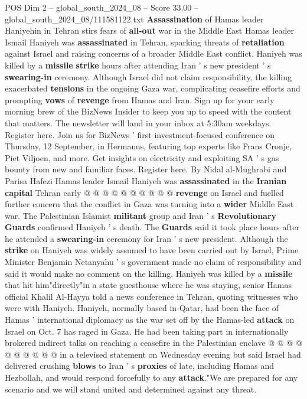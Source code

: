 \begin{textsample}{POS Dim 2 – global\_south\_2024\_08 – Score 33.00 – global\_south\_2024\_08/111581122.txt}  \label{ex:f2_pos_004}
\textbf{Assassination} of Hamas leader Haniyehin in Tehran stirs fears of \textbf{all-out} war in the Middle East Hamas leader Ismail Haniyeh was \textbf{assassinated} in Tehran, sparking threats of \textbf{retaliation} against Israel and raising concerns of a broader Middle East conflict.
Haniyeh was killed by a \textbf{missile} \textbf{strike} hours after attending Iran ' s new president ' s \textbf{swearing-in} ceremony.
Although Israel did not claim responsibility, the killing exacerbated \textbf{tensions} in the ongoing Gaza war, complicating ceasefire efforts and prompting \textbf{vows} of \textbf{revenge} from Hamas and Iran.
Sign up for your early morning brew of the BizNews Insider to keep you up to speed with the content that matters.
The newsletter will land in your inbox at 5:30am weekdays.
Register here.
Join us for BizNews ' first investment-focused conference on Thursday, 12 September, in Hermanus, featuring top experts like Frans Cronje, Piet Viljoen, and more.
Get insights on electricity and exploiting SA ' s gas bounty from new and familiar faces.
Register here.
By Nidal al-Mughrabi and Parisa Hafezi Hamas leader Ismail Haniyeh was \textbf{assassinated} in the \textbf{Iranian} \textbf{capital} Tehran early @ @ @ @ @ @ @ @ @ @ \textbf{revenge} on Israel and fuelled further concern that the conflict in Gaza was turning into a \textbf{wider} Middle East war.
The Palestinian Islamist \textbf{militant} group and Iran ' s \textbf{Revolutionary} \textbf{Guards} confirmed Haniyeh ' s death.
The \textbf{Guards} said it took place hours after he attended a \textbf{swearing-in} ceremony for Iran ' s new president.
Although the \textbf{strike} on Haniyeh was widely assumed to have been carried out by Israel, Prime Minister Benjamin Netanyahu ' s government made no claim of responsibility and said it would make no comment on the killing.
Haniyeh was killed by a \textbf{missile} that hit him"directly"in a state guesthouse where he was staying, senior Hamas official Khalil Al-Hayya told a news conference in Tehran, quoting witnesses who were with Haniyeh.
Haniyeh, normally based in Qatar, had been the face of Hamas ' international diplomacy as the war set off by the Hamas-led \textbf{attack} on Israel on Oct. 7 has raged in Gaza.
He had been taking part in internationally brokered indirect talks on reaching a ceasefire in the Palestinian enclave @ @ @ @ @ @ @ @ @ @ in a televised statement on Wednesday evening but said Israel had delivered crushing \textbf{blows} to Iran ' s \textbf{proxies} of late, including Hamas and Hezbollah, and would respond forcefully to any \textbf{attack}."We are prepared for any scenario and we will stand united and determined against any threat.

\end{textsample}

